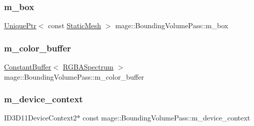 \subsubsection{\texorpdfstring{m\+\_\+box}{m\_box}}
{\footnotesize\ttfamily \hyperlink{namespacemage_a3316d7143a973e37adf1110f2e80ca31}{Unique\+Ptr}$<$ const \hyperlink{classmage_1_1_static_mesh}{Static\+Mesh} $>$ mage\+::\+Bounding\+Volume\+Pass\+::m\+\_\+box\hspace{0.3cm}{\ttfamily [private]}}

\hypertarget{classmage_1_1_bounding_volume_pass_ab5413b2a3077e32f8a0e6085b912a46b}{}\label{classmage_1_1_bounding_volume_pass_ab5413b2a3077e32f8a0e6085b912a46b} 
\subsubsection{\texorpdfstring{m\+\_\+color\+\_\+buffer}{m\_color\_buffer}}
{\footnotesize\ttfamily \hyperlink{structmage_1_1_constant_buffer}{Constant\+Buffer}$<$ \hyperlink{structmage_1_1_r_g_b_a_spectrum}{R\+G\+B\+A\+Spectrum} $>$ mage\+::\+Bounding\+Volume\+Pass\+::m\+\_\+color\+\_\+buffer\hspace{0.3cm}{\ttfamily [private]}}

\hypertarget{classmage_1_1_bounding_volume_pass_aebca32235cd63881376bcb465976238f}{}\label{classmage_1_1_bounding_volume_pass_aebca32235cd63881376bcb465976238f} 
\subsubsection{\texorpdfstring{m\+\_\+device\+\_\+context}{m\_device\_context}}
{\footnotesize\ttfamily I\+D3\+D11\+Device\+Context2$\ast$ const mage\+::\+Bounding\+Volume\+Pass\+::m\+\_\+device\+\_\+context\hspace{0.3cm}{\ttfamily [private]}}

\hypertarget{classmage_1_1_bounding_volume_pass_a682316c61230844ce232b17c2d03c702}{}\label{classmage_1_1_bounding_volume_pass_a682316c61230844ce232b17c2d03c702} 
